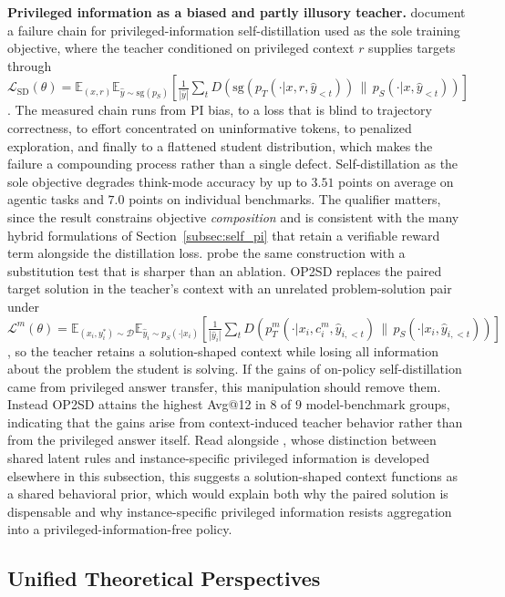 \documentclass{article} %
\newcommand{\E}{\mathbb{E}}
\begin{document}
\textbf{Privileged information as a biased and partly illusory teacher.} \citet{2608.04794} document a failure chain for privileged-information self-distillation used as the sole training objective, where the teacher conditioned on privileged context $r$ supplies targets through $\mathcal{L}_{\text{SD}}(\theta) = \E_{(x,r)}\E_{\hat{y} \sim \mathrm{sg}(p_S)}[\frac{1}{|\hat{y}|}\sum_t D(\mathrm{sg}(p_T(\cdot|x,r,\hat{y}_{<t})) \,\|\, p_S(\cdot|x,\hat{y}_{<t}))]$. The measured chain runs from PI bias, to a loss that is blind to trajectory correctness, to effort concentrated on uninformative tokens, to penalized exploration, and finally to a flattened student distribution, which makes the failure a compounding process rather than a single defect. Self-distillation as the sole objective degrades think-mode accuracy by up to $3.51$ points on average on agentic tasks and $7.0$ points on individual benchmarks. The qualifier matters, since the result constrains objective \emph{composition} and is consistent with the many hybrid formulations of Section~\ref{subsec:self_pi} that retain a verifiable reward term alongside the distillation loss. \citet{2608.09228} probe the same construction with a substitution test that is sharper than an ablation. OP2SD replaces the paired target solution in the teacher's context with an unrelated problem-solution pair under $\mathcal{L}^m(\theta) = \E_{(x_i,y_i^*) \sim \mathcal{D}}\E_{\hat{y}_i \sim p_S(\cdot|x_i)}[\frac{1}{|\hat{y}_i|}\sum_t D(p_T^m(\cdot|x_i,c_i^m,\hat{y}_{i,<t}) \,\|\, p_S(\cdot|x_i,\hat{y}_{i,<t}))]$, so the teacher retains a solution-shaped context while losing all information about the problem the student is solving. If the gains of on-policy self-distillation came from privileged answer transfer, this manipulation should remove them. Instead OP2SD attains the highest Avg@12 in $8$ of $9$ model-benchmark groups, indicating that the gains arise from context-induced teacher behavior rather than from the privileged answer itself. Read alongside \citet{2605.11182}, whose distinction between shared latent rules and instance-specific privileged information is developed elsewhere in this subsection, this suggests a solution-shaped context functions as a shared behavioral prior, which would explain both why the paired solution is dispensable and why instance-specific privileged information resists aggregation into a privileged-information-free policy.

\subsection{Unified Theoretical Perspectives}
\label{subsec:theory}
\end{document}
